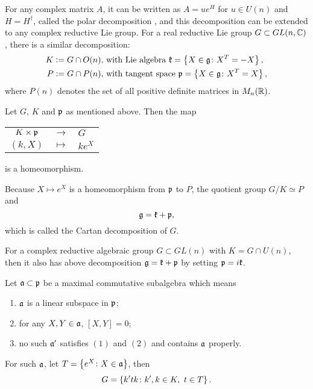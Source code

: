 \documentclass[suri,pdfbookmark]{engsuribt} %
\begin{document}
  For any complex matrix $A$, it can be written as $A = u e^{H}$ for $u \in U(n)$ and $H = H^{\dagger}$, called the polar decomposition \cite{key27}, and this decomposition can be extended to any complex reductive Lie group. For a real reductive Lie group $G \subset GL(n,\mathbb{C})$, there is a similar decomposition:
  \begin{equation*}
    \begin{split}
      K \vcentcolon= G \cap O(n),~&\text{with Lie algebra } \mathfrak{k} = \left\{X \in \mathfrak{g} \colon X^T=-X\right\}, \\
      P \vcentcolon= G \cap P(n),~&\text{with tangent space } \mathfrak{p} = \left\{X \in \mathfrak{g} \colon X^T=X\right\},
    \end{split}
  \end{equation*}
  where $P(n)$ denotes the set of all positive definite matrices in $M_n(\mathbb{R})$.
  \begin{thm}
    Let $G$, $K$ and $\mathfrak{p}$ as mentioned above. Then the map
    \begin{center}
      \begin{tabular}{c c l}
        $K \times \mathfrak{p}$ & $\longrightarrow$ & $G$ \\
         $(k,X)$ & $\longmapsto$ & $ke^X$
      \end{tabular}
    \end{center}
    is a homeomorphism.
  \end{thm}
  Because $X \mapsto e^X$ is a homeomorphism from $\mathfrak{p}$ to $P$, the quotient group $G/K \simeq P$ and 
  \begin{equation*}
     \mathfrak{g} = \mathfrak{k} + \mathfrak{p},
  \end{equation*}
  which is called the Cartan decomposition of $G$.
  \begin{rem}
    For a complex reductive algebraic group $G \subset GL(n)$ with $K = G \cap U(n)$, then it also has above decomposition $\mathfrak{g} = \mathfrak{k} + \mathfrak{p}$ by setting $\mathfrak{p} = i\mathfrak{k}$.
  \end{rem}

  Let $\mathfrak{a} \subset \mathfrak{p}$ be a maximal commutative subalgebra which means 
  \begin{enumerate}[label = (\arabic*)]
    \item $\mathfrak{a}$ is a linear subspace in $\mathfrak{p}$;
    \item for any $X,Y\in \mathfrak{a}$, $[X,Y] = 0$;
    \item no such $\mathfrak{a}^{\prime}$ satisfies $(1)$ and $(2)$ and contains $\mathfrak{a}$ properly.
  \end{enumerate}
  For such $\mathfrak{a}$, let $T = \left\{e^{X} \colon X \in \mathfrak{a}\right\}$, then \cite{key5}
  \begin{equation*}\label{eq:3}
    G = \left\{k^{\prime}tk \colon k^{\prime},k \in K,~t \in T\right\}.
  \end{equation*}
\end{document}

